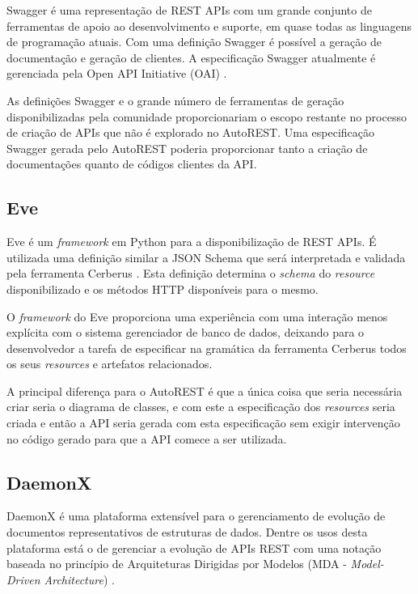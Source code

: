 Swagger \cite{SWAGGER} é uma representação de REST APIs com um grande conjunto de ferramentas de apoio ao desenvolvimento e suporte, em quase todas as linguagens de programação atuais. Com uma definição Swagger é possível a geração de documentação e geração de clientes. A especificação Swagger atualmente é gerenciada pela Open API Initiative (OAI) \cite{OpenAPII}.

As definições Swagger e o grande número de ferramentas de geração disponibilizadas pela comunidade proporcionariam o escopo restante no processo de criação de APIs que não é explorado no AutoREST. Uma especificação Swagger gerada pelo AutoREST poderia proporcionar tanto a criação de documentações quanto de códigos clientes da API.


\subsection{Eve}

Eve \cite{IAROCCI:EVE} é um \textit{framework} em Python para a disponibilização de REST APIs. É utilizada uma definição similar a JSON Schema que será interpretada e validada pela ferramenta Cerberus \cite{IAROCCI:CERBERUS}. Esta definição determina o \textit{schema} do \textit{resource} disponibilizado e os métodos HTTP disponíveis para o mesmo.

O \textit{framework} do Eve proporciona uma experiência com uma interação menos explícita com o sistema gerenciador de banco de dados, deixando para o desenvolvedor a tarefa de especificar na gramática da ferramenta Cerberus todos os seus \textit{resources} e artefatos relacionados.

A principal diferença para o AutoREST é que a única coisa que seria necessária criar seria o diagrama de classes, e com este a especificação dos \textit{resources} seria criada e então a API seria gerada com esta especificação sem exigir intervenção no código gerado para que a API comece a ser utilizada.


\subsection{DaemonX}

DaemonX é uma plataforma extensível para o gerenciamento de evolução de documentos representativos de estruturas de dados. Dentre os usos desta plataforma está o de gerenciar a evolução de APIs REST com uma notação baseada no princípio de Arquiteturas Dirigidas por Modelos (MDA - \textit{Model-Driven Architecture}) \cite{POLAK:2015}.

